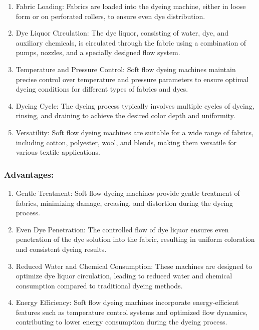 \begin{enumerate}
\item
  Fabric Loading: Fabrics are loaded into the dyeing machine, either in
  loose form or on perforated rollers, to ensure even dye distribution.
\item
  Dye Liquor Circulation: The dye liquor, consisting of water, dye, and
  auxiliary chemicals, is circulated through the fabric using a
  combination of pumps, nozzles, and a specially designed flow system.
\item
  Temperature and Pressure Control: Soft flow dyeing machines maintain
  precise control over temperature and pressure parameters to ensure
  optimal dyeing conditions for different types of fabrics and dyes.
\item
  Dyeing Cycle: The dyeing process typically involves multiple cycles of
  dyeing, rinsing, and draining to achieve the desired color depth and
  uniformity.
\item
  Versatility: Soft flow dyeing machines are suitable for a wide range
  of fabrics, including cotton, polyester, wool, and blends, making them
  versatile for various textile applications.
\end{enumerate}

\subsubsection{Advantages:}

\begin{enumerate}
\item
  Gentle Treatment: Soft flow dyeing machines provide gentle treatment
  of fabrics, minimizing damage, creasing, and distortion during the
  dyeing process.
\item
  Even Dye Penetration: The controlled flow of dye liquor ensures even
  penetration of the dye solution into the fabric, resulting in uniform
  coloration and consistent dyeing results.
\item
  Reduced Water and Chemical Consumption: These machines are designed to
  optimize dye liquor circulation, leading to reduced water and chemical
  consumption compared to traditional dyeing methods.
\item
  Energy Efficiency: Soft flow dyeing machines incorporate
  energy-efficient features such as temperature control systems and
  optimized flow dynamics, contributing to lower energy consumption
  during the dyeing process.
\end{enumerate}

